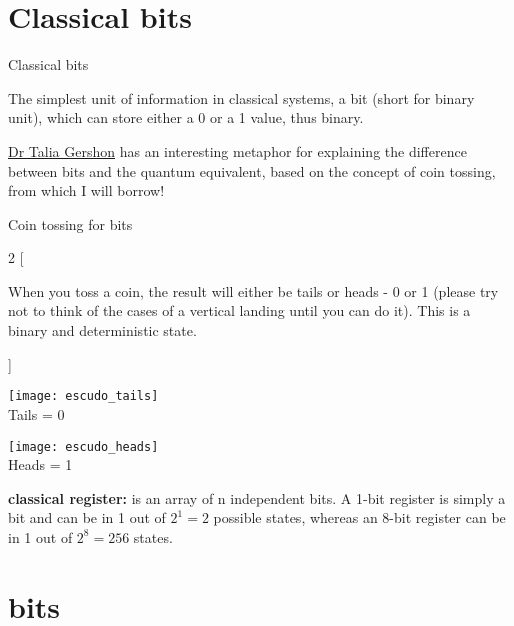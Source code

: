 \documentclass[aspectratio=43]{beamer}
\begin{document}
\section{Classical bits}
\begin{frame}{Classical bits}
    \begin{card}
    The simplest unit of information in classical systems, a bit (short for binary unit), which can store either a 0 or a 1 value, thus binary.
    \end{card}
    \begin{card}
    \href{https://twitter.com/drtaliagershon?lang=en}{Dr Talia Gershon} has an interesting metaphor for explaining the difference between bits and the quantum equivalent, based on the concept of coin tossing, from which I will borrow!
    \end{card}
\pagenumber
\end{frame}

\begin{frame}{Coin tossing for bits}
	\begin{multicols}{2}
		[
		\begin{cardTiny}
			When you toss a coin, the result will either be tails or heads - 0 or 1 (please try not to think of the cases of a vertical landing until you can do it). This is a binary and deterministic state.
		\end{cardTiny}
		]
        \begin{center}
	        \texttt{[image: escudo\_tails]}
	        \\Tails = 0
    	\end{center}
        \begin{center}
	        \texttt{[image: escudo\_heads]}
	        \\Heads = 1
    	\end{center}
	\end{multicols}
	\begin{cardTiny}
		\textbf{classical register:} is an array of n independent bits. A 1-bit register is simply a bit and can be in 1 out of $2^1 = 2$ possible states, whereas an 8-bit register can be in 1 out of $2^8 = 256$ states.
	\end{cardTiny}
\pagenumber
\end{frame}

\section{\q bits}
\end{document}
